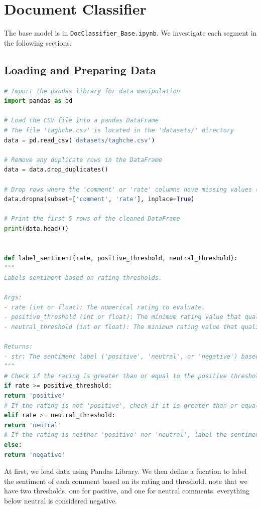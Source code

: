 \documentclass{solutionclass} %
\def\co#1{\texttt{#1}}
\begin{document}
\section{Document Classifier}

The base model is in \co{DocClassifier\_Base.ipynb}. We investigate each segment in the following sections.

\subsection*{Loading and Preparing Data}


\begin{lstlisting}[language=Python]
# Import the pandas library for data manipulation
import pandas as pd

# Load the CSV file into a pandas DataFrame
# The file 'taghche.csv' is located in the 'datasets/' directory
data = pd.read_csv('datasets/taghche.csv')

# Remove any duplicate rows in the DataFrame
data = data.drop_duplicates()

# Drop rows where the 'comment' or 'rate' columns have missing values (NaN)
data.dropna(subset=['comment', 'rate'], inplace=True)

# Print the first 5 rows of the cleaned DataFrame
print(data.head())


def label_sentiment(rate, positive_threshold, neutral_threshold):
"""
Labels sentiment based on rating thresholds.

Args:
- rate (int or float): The numerical rating to evaluate.
- positive_threshold (int or float): The minimum rating value that qualifies as 'positive'.
- neutral_threshold (int or float): The minimum rating value that qualifies as 'neutral'; ratings below this are considered 'negative'.

Returns:
- str: The sentiment label ('positive', 'neutral', or 'negative') based on the rating.
"""
# Check if the rating is greater than or equal to the positive threshold
if rate >= positive_threshold:
return 'positive'
# If the rating is not 'positive', check if it is greater than or equal to the neutral threshold
elif rate >= neutral_threshold:
return 'neutral'
# If the rating is neither 'positive' nor 'neutral', label the sentiment as 'negative'
else:
return 'negative'
\end{lstlisting}

\begin{solution}
At first, we load data using Pandas Library. We then define a fucntion to label the sentiment of each comment based on its rating and threshold. note that we have two thresholds, one for positive, and one for neutral comments. everything below neutral is considered negative.
\end{solution}
\end{document}
